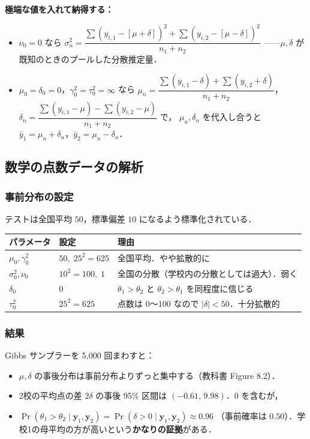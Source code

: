 \documentclass[lualatex,ja=standard,a4paper,12pt]{bxjsarticle}
\begin{document}
\begin{pointbox}
\textbf{極端な値を入れて納得する：}
\begin{itemize}
  \item $\nu_0 = 0$ なら $\sigma_n^2 = \dfrac{\sum(y_{i,1} - [\mu+\delta])^2 + \sum(y_{i,2} - [\mu-\delta])^2}{n_1 + n_2}$
        ——$\mu, \delta$ が既知のときのプールした分散推定量．
  \item $\mu_0 = \delta_0 = 0$，$\gamma_0^2 = \tau_0^2 = \infty$ なら
        $\mu_n = \dfrac{\sum(y_{i,1} - \delta) + \sum(y_{i,2} + \delta)}{n_1 + n_2}$，
        $\delta_n = \dfrac{\sum(y_{i,1} - \mu) - \sum(y_{i,2} - \mu)}{n_1 + n_2}$ で，
        $\mu_n, \delta_n$ を代入し合うと $\bar{y}_1 = \mu_n + \delta_n$，$\bar{y}_2 = \mu_n - \delta_n$．
\end{itemize}
\end{pointbox}

\subsection{数学の点数データの解析}

\subsubsection*{事前分布の設定}
テストは全国平均 $50$，標準偏差 $10$ になるよう標準化されている．
\begin{center}
\renewcommand{\arraystretch}{1.4}
\begin{tabular}{lll}
\toprule
パラメータ & 設定 & 理由 \\
\midrule
$\mu_0, \gamma_0^2$ & $50,\; 25^2 = 625$ & 全国平均．やや拡散的に \\
$\sigma_0^2, \nu_0$ & $10^2 = 100,\; 1$ & 全国の分散（学校内の分散としては過大）．弱く \\
$\delta_0$ & $0$ & $\theta_1 > \theta_2$ と $\theta_2 > \theta_1$ を同程度に信じる \\
$\tau_0^2$ & $25^2 = 625$ & 点数は 0〜100 なので $|\delta| < 50$．十分拡散的 \\
\bottomrule
\end{tabular}
\end{center}

\subsubsection*{結果}

Gibbs サンプラーを 5,000 回まわすと：
\begin{itemize}
  \item $\mu, \delta$ の事後分布は事前分布よりずっと集中する（教科書 Figure 8.2）．
  \item 2校の平均点の差 $2\delta$ の事後 95\% 区間は $(-0.61,\, 9.98)$．0 を含むが，
  \item $\Pr(\theta_1 > \theta_2 \mid \bm{y}_1, \bm{y}_2) = \Pr(\delta > 0 \mid \bm{y}_1, \bm{y}_2) \approx 0.96$
        （事前確率は $0.50$）．学校1の母平均の方が高いという\textbf{かなりの証拠}がある．
\end{itemize}
\end{document}
